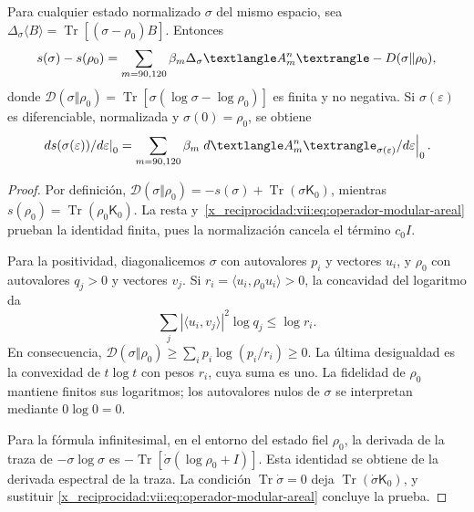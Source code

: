 \begin{theorem}
\label{x_reciprocidad:vii:thm:ley-modular-finita}
Para cualquier estado normalizado \(\sigma\) del mismo espacio, sea
\(\Delta_\sigma\langle B\rangle
=\operatorname{Tr}[(\sigma-\rho_0)B]\). Entonces
\begin{equation}
 s(\sigma)-s(\rho_0)
 =\sum_{m=90,120}\beta_m\Delta_\sigma\langle\mathcal A_m^{\rm n}\rangle
  -\mathcal D(\sigma\Vert\rho_0),
 \label{x_reciprocidad:vii:eq:ley-modular-finita}
\end{equation}
donde
\(\mathcal D(\sigma\Vert\rho_0)
=\operatorname{Tr}[\sigma(\log\sigma-\log\rho_0)]\)
es finita y no negativa. Si \(\sigma(\varepsilon)\) es diferenciable,
normalizada y \(\sigma(0)=\rho_0\), se obtiene
\begin{equation}
 \left.\frac{\mathrm ds(\sigma(\varepsilon))}{\mathrm d\varepsilon}\right|_0
 =\sum_{m=90,120}\beta_m
   \left.\frac{\mathrm d\langle\mathcal A_m^{\rm n}\rangle_{
                 \sigma(\varepsilon)}}{\mathrm d\varepsilon}\right|_0.
 \label{x_reciprocidad:vii:eq:primera-ley-modular}
\end{equation}
\end{theorem}
\begin{proof}
Por definición,
\(\mathcal D(\sigma\Vert\rho_0)=-s(\sigma)
+\operatorname{Tr}(\sigma\mathsf K_0)\), mientras
\(s(\rho_0)=\operatorname{Tr}(\rho_0\mathsf K_0)\).
La resta y~\eqref{x_reciprocidad:vii:eq:operador-modular-areal} prueban la identidad
finita, pues la normalización cancela el término \(c_0I\).

Para la positividad, diagonalicemos \(\sigma\) con autovalores
\(p_i\) y vectores \(u_i\), y \(\rho_0\) con autovalores
\(q_j>0\) y vectores \(v_j\). Si
\(r_i=\langle u_i,\rho_0u_i\rangle>0\), la concavidad del
logaritmo da
\[
 \sum_j|\langle u_i,v_j\rangle|^2\log q_j\le\log r_i.
\]
En consecuencia,
\(\mathcal D(\sigma\Vert\rho_0)
\ge\sum_i p_i\log(p_i/r_i)\ge0\).
La última desigualdad es la convexidad de \(t\log t\) con pesos
\(r_i\), cuya suma es uno. La fidelidad de \(\rho_0\) mantiene
finitos sus logaritmos; los autovalores nulos de \(\sigma\) se
interpretan mediante \(0\log0=0\).

Para la fórmula infinitesimal, en el entorno del estado fiel \(\rho_0\),
la derivada de la traza de \(-\sigma\log\sigma\) es
\(-\operatorname{Tr}[\dot\sigma(\log\rho_0+I)]\).
Esta identidad se obtiene de la derivada espectral de la traza.
La condición \(\operatorname{Tr}\dot\sigma=0\) deja
\(\operatorname{Tr}(\dot\sigma\mathsf K_0)\), y sustituir
\eqref{x_reciprocidad:vii:eq:operador-modular-areal} concluye la prueba.
\end{proof}

